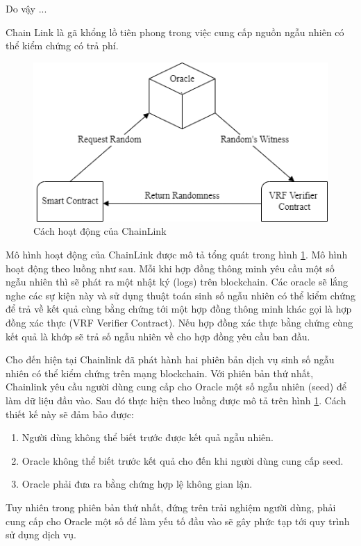 \documentclass[../main.tex]{subfiles}
\begin{document}
Do vậy ...

Chain Link là gã khổng lồ tiên phong trong việc cung cấp nguồn ngẫu nhiên có thể kiểm chứng có trả phí.
\begin{figure}[h!]
    \centering
    \includegraphics[scale = 0.8]{Figure/flow_chainLink.png}
    \caption{Cách hoạt động của ChainLink}
    \label{fig:flow_chainLink}
\end{figure}

Mô hình hoạt động của ChainLink được mô tả tổng quát trong hình \ref{fig:flow_chainLink}. Mô hình hoạt động theo luồng như sau. Mỗi khi hợp đồng thông minh yêu cầu một số ngẫu nhiên thì sẽ phát ra một nhật ký (logs) trên blockchain. Các oracle sẽ lắng nghe các sự kiện này và sử dụng thuật toán sinh số ngẫu nhiên có thể kiểm chứng để trả về kết quả cùng bằng chứng tới một hợp đồng thông minh khác gọi là hợp đồng xác thực (VRF Verifier Contract). Nếu hợp đồng xác thực bằng chứng cùng kết quả là khớp sẽ trả số ngẫu nhiên về cho hợp đồng yêu cầu ban đầu. 

Cho đến hiện tại Chainlink đã phát hành hai phiên bản dịch vụ  sinh số ngẫu nhiên có thể kiểm chứng trên mạng blockchain. Với phiên bản thứ nhất, Chainlink yêu cầu người dùng cung cấp cho Oracle một số ngẫu nhiên (seed) để làm dữ liệu đầu vào. Sau đó thực hiện theo luồng được mô tả trên hình \ref{fig:flow_chainLink}. Cách thiết kế này sẽ đảm bảo được:
\begin{enumerate}
    \item Người dùng không thể biết trước được kết quả ngẫu nhiên.
    \item Oracle không thể biết trước kết quả cho đến khi người dùng cung cấp seed.
    \item Oracle phải đưa ra bằng chứng hợp lệ không gian lận.
\end{enumerate}

Tuy nhiên trong phiên bản thứ nhất, đứng trên trải nghiệm người dùng, phải cung cấp cho Oracle một số để làm yếu tố đầu vào sẽ gây phức tạp tới quy trình sử dụng dịch vụ. 
\end{document}
